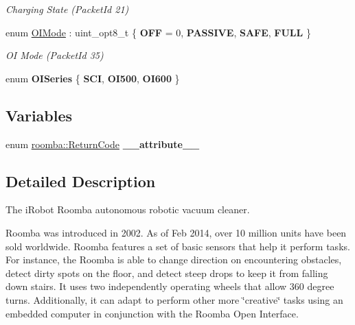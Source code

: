 \begin{DoxyCompactItemize}
\begin{DoxyCompactList}\small\item\em Charging State (Packet\+Id 21) \end{DoxyCompactList}\item 
\hypertarget{namespaceroomba_ab6a52ccd26d50ce82376d04a27c6e76a}{enum \hyperlink{namespaceroomba_ab6a52ccd26d50ce82376d04a27c6e76a}{O\+I\+Mode} \+: uint\+\_\+opt8\+\_\+t \{ {\bfseries O\+F\+F} = 0, 
{\bfseries P\+A\+S\+S\+I\+V\+E}, 
{\bfseries S\+A\+F\+E}, 
{\bfseries F\+U\+L\+L}
 \}}\label{namespaceroomba_ab6a52ccd26d50ce82376d04a27c6e76a}

\begin{DoxyCompactList}\small\item\em O\+I Mode (Packet\+Id 35) \end{DoxyCompactList}\item 
\hypertarget{namespaceroomba_aadc9d68d587640359965538f456ed81f}{enum {\bfseries O\+I\+Series} \{ {\bfseries S\+C\+I}, 
{\bfseries O\+I500}, 
{\bfseries O\+I600}
 \}}\label{namespaceroomba_aadc9d68d587640359965538f456ed81f}

\end{DoxyCompactItemize}
\subsection*{Variables}
\begin{DoxyCompactItemize}
\item 
\hypertarget{namespaceroomba_ad6cfa6f7c498e232304825995e621c16}{enum \hyperlink{namespaceroomba_aff53babe0af88b1ea8b066fd18b8f23f}{roomba\+::\+Return\+Code} {\bfseries \+\_\+\+\_\+attribute\+\_\+\+\_\+}}\label{namespaceroomba_ad6cfa6f7c498e232304825995e621c16}

\end{DoxyCompactItemize}


\subsection{Detailed Description}
The i\+Robot Roomba autonomous robotic vacuum cleaner. 

Roomba was introduced in 2002. As of Feb 2014, over 10 million units have been sold worldwide. Roomba features a set of basic sensors that help it perform tasks. For instance, the Roomba is able to change direction on encountering obstacles, detect dirty spots on the floor, and detect steep drops to keep it from falling down stairs. It uses two independently operating wheels that allow 360 degree turns. Additionally, it can adapt to perform other more \char`\"{}creative\char`\"{} tasks using an embedded computer in conjunction with the Roomba Open Interface. 

